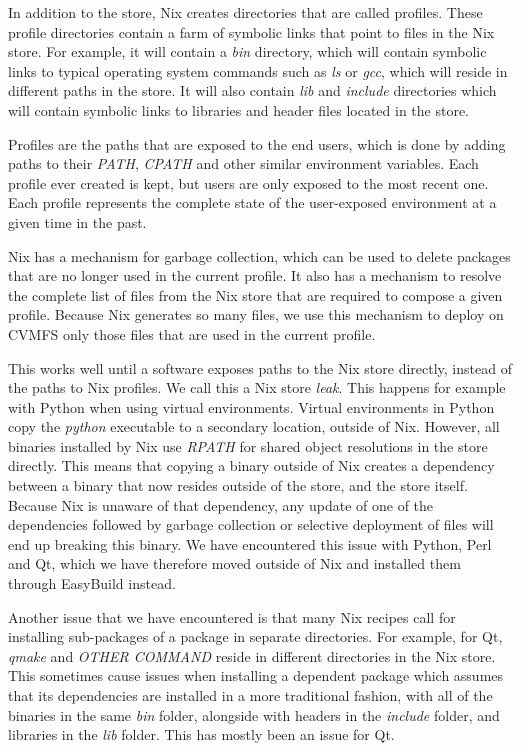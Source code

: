 \documentclass[sigconf]{acmart}
\begin{document}
In addition to the store, Nix creates directories that are called profiles. These profile directories contain a farm of symbolic links that point to files in the Nix store. For example, it will contain a {\it bin} directory, which will contain symbolic links to typical operating system commands such as {\it ls} or {\it gcc}, which will reside in different paths in the store. It will also contain {\it lib} and {\it include} directories which will contain symbolic links to libraries and header files located in the store. 

Profiles are the paths that are exposed to the end users, which is done by adding paths to their {\it PATH}, {\it CPATH} and other similar environment variables. Each profile ever created is kept, but users are only exposed to the most recent one. Each profile represents the complete state of the user-exposed environment at a given time in the past.

Nix has a mechanism for garbage collection, which can be used to delete packages that are no longer used in the current profile. It also has a mechanism to resolve the complete list of files from the Nix store that are required to compose a given profile. Because Nix generates so many files, we use this mechanism to deploy on CVMFS only those files that are used in the current profile. 

This works well until a software exposes paths to the Nix store directly, instead of the paths to Nix profiles. We call this a Nix store {\it leak}. This happens for example with Python when using virtual environments. Virtual environments in Python copy the {\it python} executable to a secondary location, outside of Nix. However, all binaries installed by Nix use {\it RPATH} for shared object resolutions in the store directly. This means that copying a binary outside of Nix creates a dependency between a binary that now resides outside of the store, and the store itself. Because Nix is unaware of that dependency, any update of one of the dependencies followed by garbage collection or selective deployment of files will end up breaking this binary. We have encountered this issue with Python, Perl and Qt, which we have therefore moved outside of Nix and installed them through EasyBuild instead.

Another issue that we have encountered is that many Nix recipes call for installing sub-packages of a package in separate directories. For example, for Qt, {\it qmake} and {\it OTHER COMMAND} reside in different directories in the Nix store. This sometimes cause issues when installing a dependent package which assumes that its dependencies are installed in a more traditional fashion, with all of the binaries in the same {\it bin} folder, alongside with headers in the {\it include} folder, and libraries in the {\it lib} folder. This has mostly been an issue for Qt. 
\end{document}
